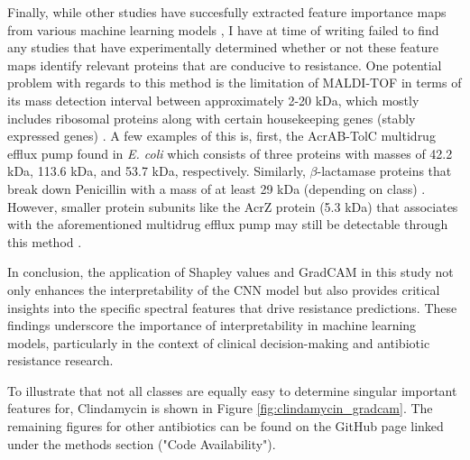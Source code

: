 \documentclass[english,11pt,a4paper,titlepage]{article}
\begin{document}
Finally, while other studies have succesfully extracted feature importance maps from various machine learning models \cite{weisDirectAntimicrobialResistance2022,wangRapidDetectionHeterogeneous2018,feucherollesCombinationMALDITOFMass2022}, I have at time of writing failed to find any studies that have experimentally determined whether or not these feature maps identify relevant proteins that are conducive to resistance. One potential problem with regards to this method is the limitation of MALDI-TOF in terms of its mass detection interval between approximately 2-20 kDa, which mostly includes ribosomal proteins along with certain housekeeping genes (stably expressed genes) \cite{singhalMALDITOFMassSpectrometry2015}. A few  examples of this is, first, the AcrAB-TolC multidrug efflux pump found in \textit{E. coli}  \cite{wangAllostericTransportMechanism2017} which consists of three proteins with masses of 42.2 kDa, 113.6 kDa, and 53.7 kDa, respectively. Similarly, \( \beta \)-lactamase proteins that break down Penicillin with a mass of at least 29 kDa (depending on class) \cite{jelschLactamaseTEM1Coli1992}. However, smaller protein subunits like the AcrZ protein (5.3 kDa) that associates with the aforementioned multidrug efflux pump may still be detectable through this method \cite{hobbsConservedSmallProtein2012}. 

In conclusion, the application of Shapley values and GradCAM in this study not only enhances the interpretability of the CNN model but also provides critical insights into the specific spectral features that drive resistance predictions. These findings underscore the importance of interpretability in machine learning models, particularly in the context of clinical decision-making and antibiotic resistance research.

To illustrate that not all classes are equally easy to determine singular important features for, Clindamycin is shown in Figure \ref{fig:clindamycin_gradcam}. The remaining figures for other antibiotics can be found on the GitHub page linked under the methods section ("Code Availability").
\end{document}
